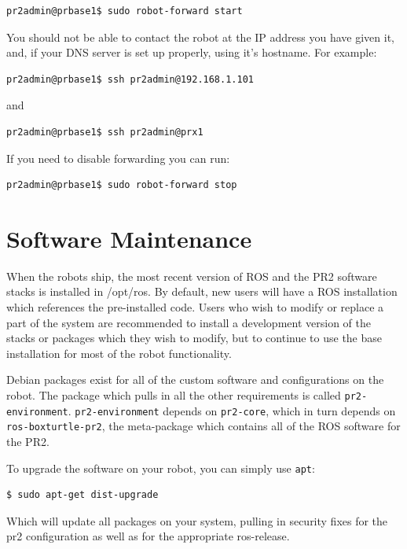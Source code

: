 \begin{verbatim}
pr2admin@prbase1$ sudo robot-forward start
\end{verbatim}

You should not be able to contact the robot at the IP address you have
given it, and, if your DNS server is set up properly, using it's
hostname.  For example:

\begin{verbatim}
pr2admin@prbase1$ ssh pr2admin@192.168.1.101
\end{verbatim}

and

\begin{verbatim}
pr2admin@prbase1$ ssh pr2admin@prx1
\end{verbatim}

If you need to disable forwarding you can run:

\begin{verbatim}
pr2admin@prbase1$ sudo robot-forward stop
\end{verbatim}

\section{Software Maintenance}

When the robots ship, the most recent version of ROS and the PR2
software stacks is installed in /opt/ros.  By default, new users will
have a ROS installation which references the pre-installed code.
Users who wish to modify or replace a part of the system are
recommended to install a development version of the stacks or packages
which they wish to modify, but to continue to use the base
installation for most of the robot functionality.

Debian packages exist for all of the custom software and
configurations on the robot.  The package which pulls in all the other
requirements is called \texttt{pr2-environment}.
\texttt{pr2-environment} depends on \texttt{pr2-core}, which in turn
depends on \texttt{ros-boxturtle-pr2}, the meta-package which contains
all of the ROS software for the PR2.

To upgrade the software on your robot, you can simply use \texttt{apt}:

\begin{verbatim}
$ sudo apt-get dist-upgrade
\end{verbatim}

Which will update all packages on your system, pulling in security fixes for
the pr2 configuration as well as for the appropriate ros-release.


